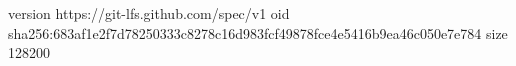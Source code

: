 version https://git-lfs.github.com/spec/v1
oid sha256:683af1e2f7d78250333c8278c16d983fcf49878fce4e5416b9ea46c050e7e784
size 128200
